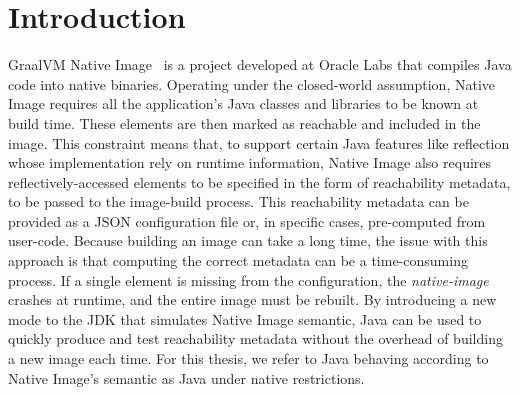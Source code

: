 \chapter{Introduction}




GraalVM Native Image~\cite{noauthor_native_nodate} is a project developed at Oracle Labs that compiles Java code into native binaries. Operating under the closed-world assumption, Native Image requires all the application's Java classes and libraries to be known at build time. These elements are then marked as reachable and included in the image.
This constraint means that, to support certain Java features like reflection whose implementation rely on runtime information, Native Image also requires reflectively-accessed elements to be specified in the form of reachability metadata, to be passed to the image-build process. This reachability metadata can be provided as a JSON configuration file or, in specific cases, pre-computed from user-code.
Because building an image can take a long time, the issue with this approach is that computing the correct metadata can be a time-consuming process. If a single element is missing from the configuration, the \textit{native-image} crashes at runtime, and the entire image must be rebuilt.
By introducing a new mode to the JDK that simulates Native Image semantic, Java can be used to quickly produce and test reachability metadata without the overhead of building a new image each time. For this thesis, we refer to Java behaving according to Native Image's semantic as Java under native restrictions.


